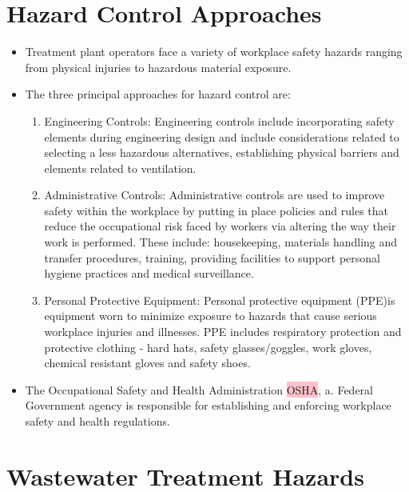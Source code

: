 \section{Hazard Control Approaches}
\begin{itemize}
\item Treatment plant operators face a variety of workplace safety hazards ranging from physical injuries to hazardous material exposure.  
\item The three principal approaches for hazard control are:
\begin{enumerate}
\item Engineering Controls:  Engineering controls include incorporating safety elements during engineering design and include considerations related to selecting a less hazardous alternatives, establishing  physical barriers and elements related to ventilation.
\item Administrative Controls:  Administrative controls are used to improve safety within the workplace by putting in place policies and rules that reduce the occupational risk faced by workers via altering the way their work is performed.  These include: housekeeping, materials handling and transfer procedures, training, providing facilities to support personal hygiene practices and medical surveillance.
\item Personal Protective Equipment: Personal protective equipment (PPE)is equipment worn to minimize exposure to hazards that cause serious workplace injuries and illnesses.  PPE includes respiratory protection and protective clothing - hard hats, safety
glasses/goggles, work gloves, chemical resistant gloves and safety shoes.

\end{enumerate}
\item The Occupational Safety and Health Administration \colorbox{pink}{OSHA}, a. Federal Government agency is responsible for establishing and enforcing workplace safety and health regulations.
\end{itemize}


\section{Wastewater Treatment Hazards}
